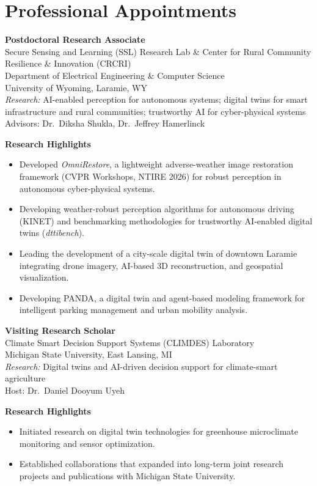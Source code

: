 \documentclass[11pt, letterpaper]{article}
\newcommand{\entry}[2]{%
  \begin{list}{}{%
    \setlength{\leftmargin}{0.17\linewidth}%
    \setlength{\labelwidth}{0.15\linewidth}%
    \setlength{\labelsep}{0.02\linewidth}%
    \setlength{\topsep}{3pt}%
    \setlength{\parsep}{2pt}%
    \setlength{\itemsep}{0pt}%
    \renewcommand{\makelabel}[1]{\parbox[t]{0.15\linewidth}{\small\raggedright\color{uwred}##1}\hfill}%
  }%
  \item[{#1}] #2%
  \end{list}%
}
\newcommand{\role}[1]{{\color{uwred}\textbf{#1}}}
\newcommand{\research}[1]{{\color{uwred}\textit{Research:}} #1}
\begin{document}
\section{Professional Appointments}%
\entry{Aug 2025 --\\Present}{%
  \role{Postdoctoral Research Associate}\\
  Secure Sensing and Learning (SSL) Research Lab \& Center for Rural Community Resilience \& Innovation (CRCRI)\\
  Department of Electrical Engineering \& Computer Science\\
  University of Wyoming, Laramie, WY\\
  \research{AI-enabled perception for autonomous systems; digital twins for smart infrastructure and rural communities; trustworthy AI for cyber-physical systems}\\
  Advisors: Dr.~Diksha Shukla, Dr.~Jeffrey Hamerlinck

  \vspace{0pt}
  \textbf{Research Highlights}
  \begin{itemize}
      \item Developed \textit{OmniRestore}, a lightweight adverse-weather image restoration framework (CVPR Workshops, NTIRE 2026) for robust perception in autonomous cyber-physical systems.
      \item Developing weather-robust perception algorithms for autonomous driving (KINET) and benchmarking methodologies for trustworthy AI-enabled digital twins (\textit{dttibench}).
      \item Leading the development of a city-scale digital twin of downtown Laramie integrating drone imagery, AI-based 3D reconstruction, and geospatial visualization.
      \item Developing PANDA, a digital twin and agent-based modeling framework for intelligent parking management and urban mobility analysis.
  \end{itemize}
}

\entry{Jan 2024 --\\Feb 2024}{%
  \role{Visiting Research Scholar}\\
  Climate Smart Decision Support Systems (CLIMDES) Laboratory\\
  Michigan State University, East Lansing, MI\\
  \research{Digital twins and AI-driven decision support for climate-smart agriculture}\\
  Host: Dr.~Daniel Dooyum Uyeh


  \textbf{Research Highlights}
  \begin{itemize}
      \item Initiated research on digital twin technologies for greenhouse microclimate monitoring and sensor optimization.
      \item Established collaborations that expanded into long-term joint research projects and publications with Michigan State University.
  \end{itemize}
}
\end{document}
